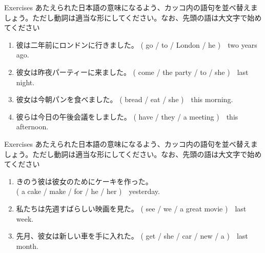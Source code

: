 \documentclass[aspectratio=169,xcolor={dvipsnames,table}]{beamer}
\newcommand{\myaudio}[1]{\href{#1}{\faVolumeUp}}
\begin{document}
\begin{frame}[plain]{Exercises}
あたえられた日本語の意味になるよう、カッコ内の語句を並べ替えましょう。ただし動詞は適当な形にしてください。なお、先頭の語は大文字で始めてください


\begin{enumerate}
 \item 彼は二年前にロンドンに行きました。
(  go / to / London / he )~~two years ago.\\
 \item 彼女は昨夜パーティーに来ました。\hspace{1\zw}
( come / the  party / to / she )~~last night.\\
 \item 彼女は今朝パンを食べました。\hspace{2.65\zw}
( bread / eat /  she  )~~this morning.\\
 \item 彼らは今日の午後会議をしました。\hspace{.75\zw}
( have / they / a meeting )~~this afternoon.\\
\end{enumerate}
\hfill\myaudio{./audio/025_past_do_15.mp3}

\end{frame}
\begin{frame}[plain]{Exercises}
あたえられた日本語の意味になるよう、カッコ内の語句を並べ替えましょう。ただし動詞は適当な形にしてください。なお、先頭の語は大文字で始めてください

\begin{enumerate}
 \item きのう彼は彼女のためにケーキを作った。\\
\mbox{}\hfill{}( a cake / make / for / he / her )~~yesterday.\\
 \item 私たちは先週すばらしい映画を見た。
\hfill{}( see / we / a great movie )~~last week.\\
 \item 先月、彼女は新しい車を手に入れた。
( get / she / car  / new / a )~~last month.\\

\end{enumerate}
\hfill\myaudio{./audio/025_past_do_16.mp3}

\end{frame}
\end{document}
